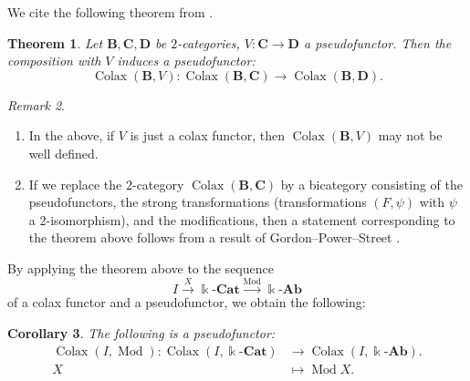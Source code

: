 \documentclass{surv-l}
\numberwithin{equation}{chapter}
\numberwithin{figure}{chapter}
\theoremstyle{plain}
\newtheorem{thm}{Theorem}[section]
\newtheorem{cor}[thm]{Corollary}
\theoremstyle{definition}
\theoremstyle{remark}
\newtheorem{rmk}[thm]{Remark}
\newcommand{\kCat}{\Bbbk\text{-}\mathbf{Cat}}
\newcommand{\kAb}{\Bbbk\text{-}\mathbf{Ab}}
\DeclareMathOperator{\Mod}{Mod}
\DeclareMathOperator{\Colax}{Colax}
\begin{document}
We cite the following theorem from \cite[Theorem 6.5]{Asa-b}.

\begin{thm}\label{comp-pseudofun}
Let $\mathbf{B}, \mathbf{C}, \mathbf{D}$ be $2$-categories, $V \colon \mathbf{C} \to \mathbf{D}$ a pseudofunctor.
Then the composition with $V$ induces a pseudofunctor:
\begin{equation*}
\Colax(\mathbf{B}, V) \colon \Colax(\mathbf{B}, \mathbf{C}) \to \Colax(\mathbf{B}, \mathbf{D}).
\end{equation*}
\end{thm}

\begin{rmk}
\leavevmode
\begin{enumerate}
\item In the above, if $V$ is just a colax functor, then $\Colax(\mathbf{B}, V)$
may not be well defined.
\item If we replace the $2$-category $\Colax(\mathbf{B}, \mathbf{C})$ by a bicategory
consisting of the pseudofunctors, the strong transformations
(transformations $(F, \psi)$ with $\psi$ a $2$-isomorphism), and the modifications,
then a statement corresponding to the theorem above follows from
a result of Gordon--Power--Street \cite{GPS95}.
\end{enumerate}
\end{rmk}

By applying the theorem above to the sequence
\begin{equation*}
I \xrightarrow{X} \kCat \xrightarrow{\Mod} \kAb
\end{equation*}
of a colax functor and a pseudofunctor, we obtain the following:

\begin{cor}
The following is a pseudofunctor:
\begin{equation*}
\begin{aligned}
\Colax(I, \Mod)\colon \Colax(I, \kCat)  &\to \Colax(I, \kAb).\\
X &\mapsto \Mod X.\\
\end{aligned}
\end{equation*}
\end{cor}
\end{document}
